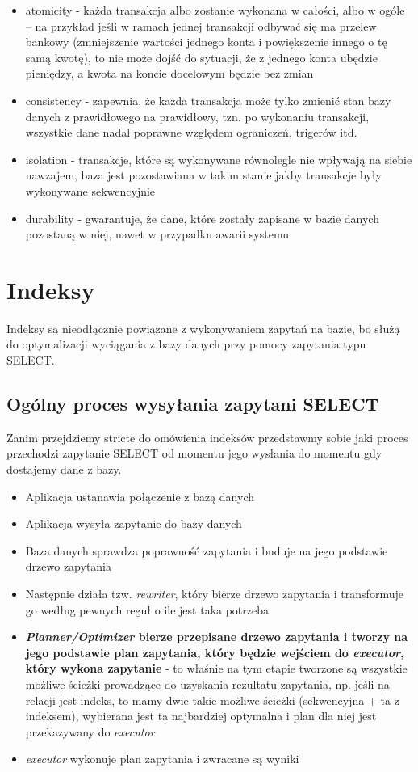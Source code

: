 \documentclass[a4paper,15pt]{article}
\begin{document}
\begin{itemize}
\item atomicity - każda transakcja albo zostanie wykonana w całości, albo w ogóle – na przykład jeśli w ramach jednej transakcji odbywać się ma przelew bankowy (zmniejszenie wartości jednego konta i powiększenie innego o tę samą kwotę), to nie może dojść do sytuacji, że z jednego konta ubędzie pieniędzy, a kwota na koncie docelowym będzie bez zmian
\item consistency - zapewnia, że każda transakcja może tylko zmienić stan bazy danych z prawidłowego na prawidłowy, tzn. po wykonaniu transakcji, wszystkie dane nadal poprawne względem ograniczeń, trigerów itd.   
\item isolation - transakcje, które są wykonywane równolegle nie wpływają na siebie nawzajem, baza jest pozostawiana w takim stanie jakby transakcje były wykonywane sekwencyjnie
\item durability - gwarantuje, że dane, które zostały zapisane w bazie danych pozostaną w niej, nawet w przypadku awarii systemu 
\end{itemize}




\newpage
\section{Indeksy}
Indeksy są nieodłącznie powiązane z wykonywaniem zapytań na bazie, bo służą do optymalizacji wyciągania z bazy danych przy pomocy zapytania typu SELECT. 

\subsection{Ogólny proces wysyłania zapytani SELECT}
Zanim przejdziemy stricte do omówienia indeksów przedstawmy sobie jaki proces przechodzi zapytanie SELECT od momentu jego wysłania do momentu gdy dostajemy dane z bazy. 
\begin{itemize}
\item Aplikacja ustanawia połączenie z bazą danych
\item Aplikacja wysyła zapytanie do bazy danych
\item Baza danych sprawdza poprawność zapytania i buduje na jego podstawie drzewo zapytania
\item Następnie działa tzw. \textit{rewriter}, który bierze drzewo zapytania i transformuje go według pewnych reguł o ile jest taka potrzeba
\item \textbf{\textit{Planner/Optimizer} bierze przepisane drzewo zapytania i tworzy na jego podstawie plan zapytania, który będzie wejściem do \textit{executor}, który wykona zapytanie} - to właśnie na tym etapie tworzone są wszystkie możliwe ścieżki prowadzące do uzyskania rezultatu zapytania, np. jeśli na relacji jest indeks, to mamy dwie takie możliwe ścieżki (sekwencyjna + ta z indeksem), wybierana jest ta najbardziej optymalna i plan dla niej jest przekazywany do \textit{executor}
\item \textit{executor} wykonuje plan zapytania i zwracane są wyniki
\end{itemize}
\end{document}
